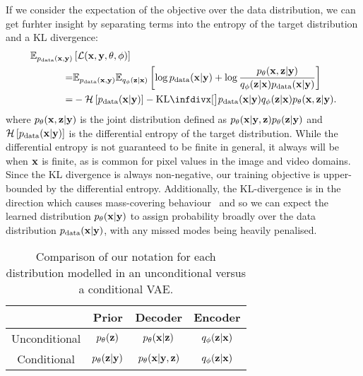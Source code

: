 If we consider the expectation of the objective over the data distribution, we can get furhter insight by separating terms into the entropy of the target distribution and a KL divergence:
\begin{align}
  \EX_{\pdata(\rvx,\rvy)} &\left[ \mathcal{L}(\rvx, \rvy, \theta, \phi) \right] \\
  =& \EX_{\pdata(\rvx,\rvy)} \EX_{q_\phi(\rvz|\rvx)} \left[ \log \pdata(\rvx|\rvy) + \log \frac{p_\theta(\rvx,\rvz|\rvy)}{q_\phi(\rvz|\rvx)\pdata(\rvx|\rvy)} \right]\\
    =& -\mathcal{H}\left[ \pdata(\rvx|\rvy) \right] - \kl[\big] { \pdata(\rvx|\rvy) q_\phi(\rvz|\rvx) }{ p_\theta(\rvx,\rvz|\rvy) }. \label{eq:elbo-kl-joints}
\end{align}
where $p_\theta({\mathbf{x}},{\mathbf{z}}|{\mathbf{y}})$ is the joint distribution defined as $p_\theta({\mathbf{x}}|{\mathbf{y}},{\mathbf{z}})p_\theta({\mathbf{z}}|{\mathbf{y}})$ and $\mathcal{H}\left[ p_{\rm{data}}({\mathbf{x}}|{\mathbf{y}}) \right]$ is the differential entropy of the target distribution. While the differential entropy is not guaranteed to be finite in general, it always will be when ${\mathbf{x}}$ is finite, as is common for pixel values in the image and video domains. Since the KL divergence is always non-negative, our training objective is upper-bounded by the differential entropy. Additionally, the KL-divergence is in the direction which causes mass-covering behaviour~\citep{bishop2006pattern} and so we can expect the learned distribution $p_\theta({\mathbf{x}}|{\mathbf{y}})$ to assign probability broadly over the data distribution $p_{\rm{data}}({\mathbf{x}}|{\mathbf{y}})$, with any missed modes being heavily penalised.

\begin{table}[t]
\centering
\begin{tabular}{c|c|c|c}
 & Prior & Decoder & Encoder \\ 
\hline
Unconditional & \( p_\theta({\mathbf{z}}) \) & \( p_\theta({\mathbf{x}}|{\mathbf{z}}) \) & \( q_\phi({\mathbf{z}}|{\mathbf{x}}) \) \\
Conditional & \( p_\theta({\mathbf{z}}|{\mathbf{y}}) \) & \( p_\theta({\mathbf{x}}|{\mathbf{y}},{\mathbf{z}}) \) & \( q_\phi({\mathbf{z}}|{\mathbf{x}}) \) \\
\end{tabular}
\caption{Comparison of our notation for each distribution modelled in an unconditional versus a conditional VAE.}
\label{tab:vae_components}
\end{table}


